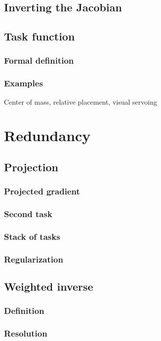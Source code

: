 \documentclass{book}
\begin{document}
\section{Inverting the Jacobian}
\section{Task function}
\subsection{Formal definition}
\subsection{Examples}
Center of mass, relative placement, visual servoing

\chapter{Redundancy}

\section{Projection}
\subsection{Projected gradient}
\subsection{Second task}
\subsection{Stack of tasks}
\subsection{Regularization}

\section{Weighted inverse}
\subsection{Definition}
\subsection{Resolution}
\end{document}
